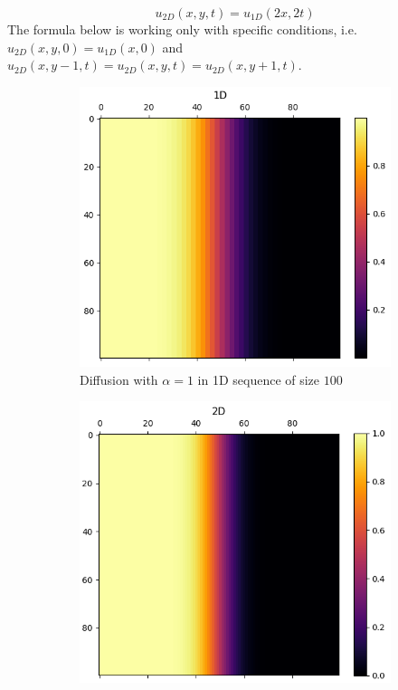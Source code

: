 \begin{equation}
    u_{2D}(x,y,t)=u_{1D}(2x,2t) 
    \label{eq:2D_1D_basic}
\end{equation}
%
The formula below is working only with specific conditions, i.e. $u_{2D}(x,y,0)=u_{1D}(x,0)$
and $u_{2D}(x,y-1,t)=u_{2D}(x,y,t)=u_{2D}(x,y+1,t)$.

\begin{figure}[h]
    \centering
    \begin{subfigure}[b]{0.49\textwidth}
        \centering
        \includegraphics[width=\textwidth]{figures/1d_100t_1a.png}
        \caption{Diffusion with $\alpha = 1$ in 1D sequence of size $100$}
        \label{fig:diff_1d_100}
    \end{subfigure}
    \hfill
    \begin{subfigure}[b]{0.49\textwidth}
        \centering
        \includegraphics[width=\textwidth]{figures/2d_100t_1a.png}

\end{subfigure}
\end{figure}

